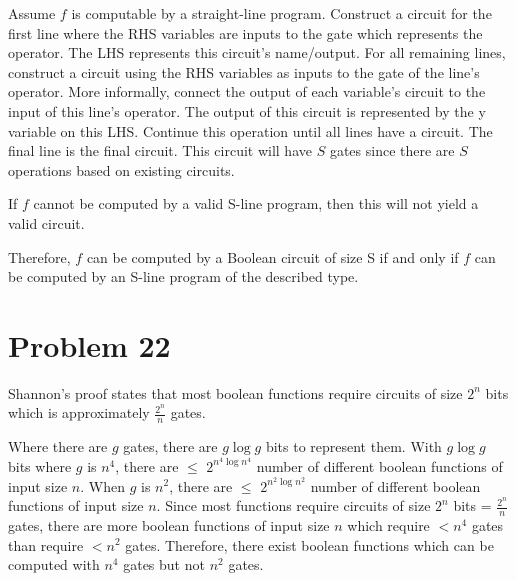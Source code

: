 \documentclass{article}
\begin{document}
Assume $f$ is computable by a straight-line program.  Construct a circuit for the first line where the RHS variables are inputs to the gate which represents the operator.  The LHS represents this circuit's name/output.  For all remaining lines, construct a circuit using the RHS variables as inputs to the gate of the line's operator.  More informally, connect the output of each variable's circuit to the input of this line's operator.  The output of this circuit is represented by the y variable on this LHS.  Continue this operation until all lines have a circuit.  The final line is the final circuit.  This circuit will have $S$ gates since there are $S$ operations based on existing circuits.

If $f$ cannot be computed by a valid S-line program, then this will not yield a valid circuit.

Therefore, $f$ can be computed by a Boolean circuit of size S if and only if $f$ can be computed by an S-line program of the described type.

\section{Problem 22}
Shannon's proof states that most boolean functions require circuits of size $2^{n}$ bits which is approximately $\frac{2^{n}}{n}$ gates.

Where there are $g$ gates, there are $g \log g$ bits to represent them.  With $g \log g$ bits where $g$ is $n^{4}$, there are $\leq$ $2^{n^4 \log n^4}$ number of different boolean functions of input size $n$.  When $g$ is $n^2$, there are $\leq$ $2^{n^2 \log n^2}$ number of different boolean functions of input size $n$.  Since most functions require circuits of size $2^n$ bits = $\frac{2^n}{n}$ gates, there are more boolean functions of input size $n$ which require $< n^4$ gates than require $< n^2$ gates.  Therefore, there exist boolean functions which can be computed with $n^4$ gates but not $n^2$ gates.
\end{document}
